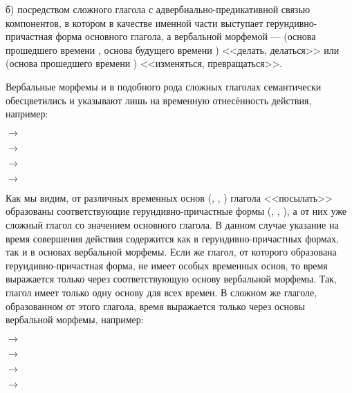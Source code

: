 б) посредством сложного глагола с адвербиально-предикативной связью компонентов, в котором в качестве именной части выступает герундивно-причастная форма основного
глагола, а вербальной морфемой ---  (основа прошедшего времени , основа будущего времени ) <<делать, делаться>> или  (основа прошедшего времени ) <<изменяться, превращаться>>.

Вербальные морфемы  и  в подобного рода сложных глаголах семантически обесцветились и указывают лишь на временную отнесённость действия, например:
\begin{prfsample}
	\item {} $\rightarrow$
	\item \quad$\rightarrow$ 
	\item \quad$\rightarrow$ 
	\item \quad$\rightarrow$ 
\end{prfsample}

Как мы видим, от различных временных основ (, , ) глагола <<посылать>> образованы соответствующие герундивно-причастные формы (, , ), а от них уже сложный глагол со значением основного глагола. В данном случае указание на время совершения действия содержится как в герундивно-причастных формах, так и в основах вербальной морфемы. Если же глагол, от которого образована герундивно-причастная форма, не имеет особых временных основ, то время выражается только через соответствующую основу вербальной морфемы. Так, глагол
 имеет только одну основу для всех времен. В сложном же глаголе, образованном от этого глагола, время выражается только через основы вербальной морфемы, например:

\begin{prfsample}
	\item {} $\rightarrow$
	\item \quad$\rightarrow$ 
	\item \quad$\rightarrow$ 
	\item \quad$\rightarrow$ 
\end{prfsample}

